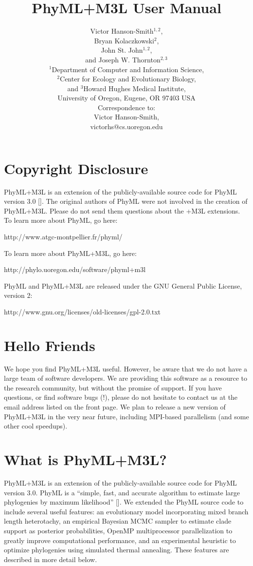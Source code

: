 \documentclass[11pt]{article}
\title{PhyML+M3L User Manual}
\author{
Victor Hanson-Smith$^{1,2}$,\\Bryan Kolaczkowski$^{2}$,\\John St. John$^{1,2}$, \\and Joseph W. Thornton$^{2,3}$\\[1cm]
$^{1}$Department of Computer and Information Science, \\$^{2}$Center for Ecology and Evolutionary Biology,\\ and $^{3}$Howard Hughes Medical Institute, \\
University of Oregon, Eugene, OR 97403 USA\\[1cm]
Correspondence to:\\  
Victor Hanson-Smith,\\victorhs@cs.uoregon.edu\\[1cm]
}
\begin{document}
\singlespacing
\maketitle
\pagebreak

\section*{Copyright Disclosure}

PhyML+M3L is an extension of the publicly-available source code for PhyML version 3.0 [\cite{phyml}].  The original authors of PhyML were not involved in the creation of PhyML+M3L.  Please do not send them questions about the +M3L extensions.   To learn more about PhyML, go here:

\medskip
http://www.atgc-montpellier.fr/phyml/

\bigskip
 
\noindent To learn more about PhyML+M3L, go here:

\medskip
http://phylo.uoregon.edu/software/phyml+m3l

\bigskip
\bigskip

\noindent PhyML and PhyML+M3L are released under the GNU General Public License, version 2:

\medskip
http://www.gnu.org/licenses/old-licenses/gpl-2.0.txt

\pagebreak
\tableofcontents
\pagebreak

\section{Hello Friends}
\noindent We hope you find PhyML+M3L useful.  However, be aware that we do not have a large team of software developers.  We are providing this software as a resource to the research community, but without the promise of support.  If you have questions, or find software bugs (!), please do not hesitate to contact us at the email address listed on the front page.  We plan to release a new version of PhyML+M3L in the very near future, including MPI-based parallelism (and some other cool speedups).

\pagebreak
\section{What is PhyML+M3L?}
PhyML+M3L is an extension of the publicly-available source code for PhyML version 3.0.  PhyML is a ``simple, fast, and accurate algorithm to estimate large phylogenies by maximum likelihood'' [\cite{phyml}].  We extended the PhyML source code to include several useful features: an evolutionary model incorporating mixed branch length heterotachy, an empirical Bayesian MCMC sampler to estimate clade support as posterior probabilities, OpenMP multiprocessor parallelization to greatly improve computational performance, and an experimental heuristic to optimize phylogenies using simulated thermal annealing.  These features are described in more detail below.
\end{document}

